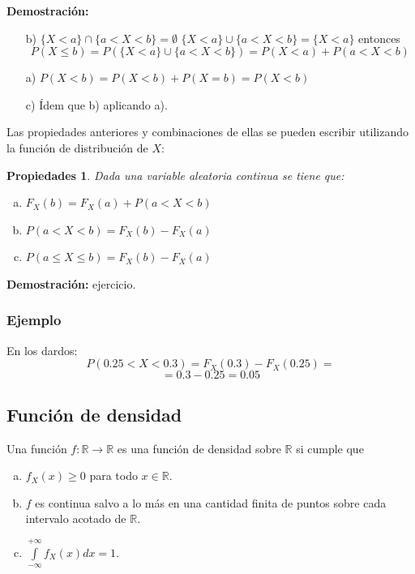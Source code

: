 \documentclass[handout]{beamer}\usepackage[]{graphicx}\usepackage[]{color}
\newcommand{\RR}{\mathbb{R}}
\renewcommand{\leq}{\leqslant}
\renewcommand{\geq}{\geqslant}
\theoremstyle{plain}
\newtheorem{prop}{Propiedades}
\theoremstyle{definition}
\begin{document}
\begin{frame}
\textbf{Demostración:}
\begin{itemize}
\item[b)] $\{X<a\}\cap \{a<X<b\}=\emptyset$
$\{X<a\}\cup \{a<X<b\}=\{X<a\}$ entonces\newline
$$P(X\leq b)=P(\{X<a\}\cup \{a<X<b\})=P(X<a)+P(a<X<b)$$
\item[a)] $P(X<b)=P(X<b)+P(X=b)=P(X<b)$
\item[c)] \'Idem que b) aplicando a).
\end{itemize}
\end{frame}

\begin{frame}
Las propiedades anteriores  y combinaciones de ellas se pueden
escribir utilizando la función de distribución de $X$:

\begin{prop}Dada una variable aleatoria continua se tiene que:
\begin{enumerate}[a)]
\item $F_{X}(b)=F_{X}(a)+P(a<X<b)$
\item $P(a<X<b)=F_{X}(b)-F_{X}(a)$
\item $P(a\leq X\leq b)=F_{X}(b)-F_{X}(a)$
\end{enumerate}
\end{prop}
\end{frame}

\begin{frame}
\textbf{Demostración:} ejercicio.

\frametitle{Ejemplo}
En los dardos:
$$P(0.25<X<0.3)=F_{X}(0.3)-F_{X}(0.25)=$$
$$=0.3-0.25=0.05$$

\end{frame}


\subsection{Función de densidad}
\begin{frame}
Una función $f:\RR\to\RR$ es una función de densidad sobre $\RR$ si cumple que

\begin{enumerate}[a)]
\item $f_{X}(x)\geq 0$ para todo $x \in\RR.$
\item $f$ es continua salvo a lo más en una cantidad finita de puntos sobre
cada intervalo acotado de $\RR$.
\item $\int\limits_{-\infty}^{+\infty} f_{X}(x) dx=1.$
\end{enumerate}
\end{frame}
\end{document}
